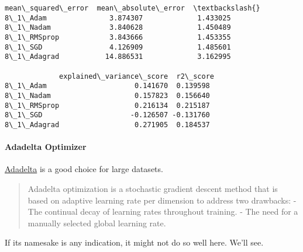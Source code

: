 \documentclass[11pt]{article}
\makeatletter
\newcommand{\boxspacing}{\kern\kvtcb@left@rule\kern\kvtcb@boxsep}
\newcommand{\prompt}[4]{
        {\ttfamily\llap{{\color{#2}[#3]:\hspace{3pt}#4}}\vspace{-\baselineskip}}
    }
\makeatother
\begin{document}
            \begin{tcolorbox}[breakable, size=fbox, boxrule=.5pt, pad at break*=1mm, opacityfill=0]
\prompt{Out}{outcolor}{65}{\boxspacing}
\begin{Verbatim}[commandchars=\\\{\}]
             mean\_squared\_error  mean\_absolute\_error  \textbackslash{}
8\_1\_Adam               3.874307             1.433025
8\_1\_Nadam              3.840628             1.450489
8\_1\_RMSprop            3.843666             1.453355
8\_1\_SGD                4.126909             1.485601
8\_1\_Adagrad           14.886531             3.162995

             explained\_variance\_score  r2\_score
8\_1\_Adam                     0.141670  0.139598
8\_1\_Nadam                    0.157823  0.156640
8\_1\_RMSprop                  0.216134  0.215187
8\_1\_SGD                     -0.126507 -0.131760
8\_1\_Adagrad                  0.271905  0.184537
\end{Verbatim}
\end{tcolorbox}
        
    \paragraph{Adadelta Optimizer}\label{adadelta-optimizer}

\href{https://keras.io/api/optimizers/adadelta/}{Adadelta} is a good
choice for large datasets.

\begin{quote}
Adadelta optimization is a stochastic gradient descent method that is
based on adaptive learning rate per dimension to address two drawbacks:
- The continual decay of learning rates throughout training. - The need
for a manually selected global learning rate.
\end{quote}

If its namesake is any indication, it might not do so well here. We'll
see.
\end{document}
